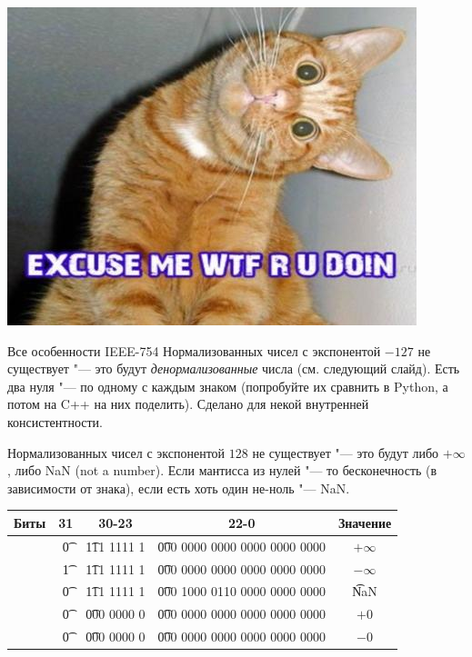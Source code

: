 \begin{frame}
	\begin{center}
		\includegraphics[scale=0.75]{what-are-you-doing.jpg}
	\end{center}
\end{frame}

\begin{frame}{Все особенности IEEE-754}
	Нормализованных чисел с экспонентой $-127$ не существует "--- это будут \textit{денормализованные} числа (см. следующий слайд).
	Есть два нуля "--- по одному с каждым знаком (попробуйте их сравнить в Python, а потом на C++ на них поделить).
	Сделано для некой внутренней консистентности.

	Нормализованных чисел с экспонентой $128$ не существует "--- это будут либо $+\infty$, либо NaN (not a number).
	Если мантисса из нулей "--- то бесконечность (в зависимости от знака), если есть хоть один не-ноль "--- NaN.
	\begin{center}
		\begin{tabular}{|r|c|c|c|c|}
			\hline
			Биты & 31 & 30-23 & 22-0 & Значение \\\hline
			& \t{0} & \t{111 1111 1} & \t{000 0000 0000 0000 0000 0000} & $+\infty $\\\hline
			& \t{1} & \t{111 1111 1} & \t{000 0000 0000 0000 0000 0000} & $-\infty $\\\hline
			& \t{0} & \t{111 1111 1} & \t{000 1000 0110 0000 0000 0000} & \t{NaN} \\\hline
			& \t{0} & \t{000 0000 0} & \t{000 0000 0000 0000 0000 0000} & $+0$ \\\hline
			& \t{0} & \t{000 0000 0} & \t{000 0000 0000 0000 0000 0000} & $-0$ \\\hline
		\end{tabular}
	\end{center}	
\end{frame}
